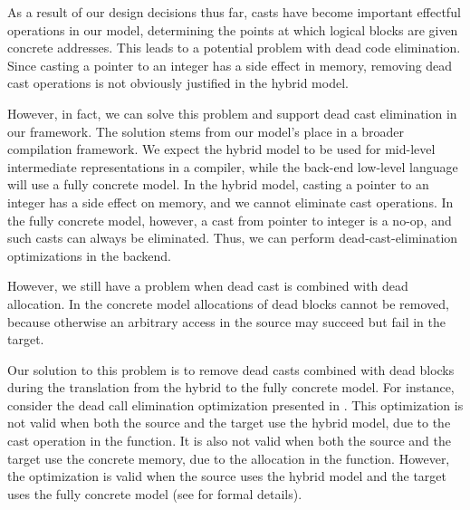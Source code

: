 As a result of our design decisions thus far, casts have become
important effectful operations in our model, determining the points at
which logical blocks are given concrete addresses. This leads to a
potential problem with dead code elimination.  Since casting a pointer
to an integer has a side effect in memory, removing dead cast
operations is not obviously justified in the hybrid model.

However, in fact,
we can solve this problem and support dead cast elimination in our
framework. 
The solution stems from our model's place in a broader compilation
framework. We expect the hybrid model to be used for mid-level
intermediate representations in a compiler, while the back-end
low-level language will use a fully concrete model. In the
hybrid model, casting a pointer to an integer has a side
effect on memory, and we cannot eliminate cast operations. In the
fully concrete model, however, a cast from pointer to integer is a 
no-op, and such casts can always be eliminated. Thus, we can
perform dead-cast-elimination optimizations in the backend.

However, we still have a problem when dead cast is combined with dead
allocation. In the concrete model allocations of dead blocks cannot be
removed, because otherwise an arbitrary access in the source may
succeed but fail in the target. 

Our solution to this problem is to remove dead casts combined with dead blocks during the
translation from the hybrid to the fully concrete model.  For instance, consider the dead call
elimination optimization presented in . This
optimization is not valid when both the source and the target use the hybrid model, due to the cast
operation in the function. It is also not valid when both the source and the target use the concrete
memory, due to the allocation in the function. However, the optimization is valid when the source
uses the hybrid model and the target uses the fully concrete model (see
 for formal details).

